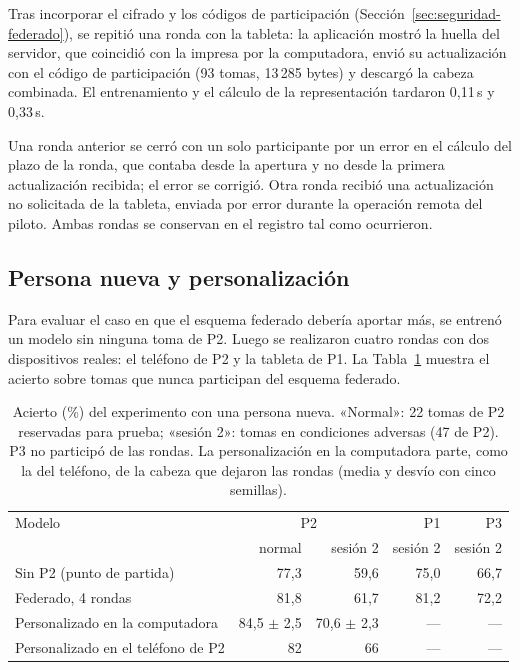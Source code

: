 Tras incorporar el cifrado y los códigos de participación (Sección~\ref{sec:seguridad-federado}), se repitió una ronda con la tableta: la aplicación mostró la huella del servidor, que coincidió con la impresa por la computadora, envió su actualización con el código de participación (93 tomas, 13\,285 bytes) y descargó la cabeza combinada. El entrenamiento y el cálculo de la representación tardaron 0,11\,s y 0,33\,s.

Una ronda anterior se cerró con un solo participante por un error en el cálculo del plazo de la ronda, que contaba desde la apertura y no desde la primera actualización recibida; el error se corrigió. Otra ronda recibió una actualización no solicitada de la tableta, enviada por error durante la operación remota del piloto. Ambas rondas se conservan en el registro tal como ocurrieron.

\subsection{Persona nueva y personalización}

Para evaluar el caso en que el esquema federado debería aportar más, se entrenó un modelo sin ninguna toma de P2. Luego se realizaron cuatro rondas con dos dispositivos reales: el teléfono de P2 y la tableta de P1. La Tabla~\ref{tab:federado-sin-p2} muestra el acierto sobre tomas que nunca participan del esquema federado.

\begin{table}[h]
    \centering
    \small
    \begin{tabular}{lrrrr}
        \toprule
        Modelo & \multicolumn{2}{c}{P2} & P1 & P3 \\
        & normal & sesión 2 & sesión 2 & sesión 2 \\
        \midrule
        Sin P2 (punto de partida) & 77,3 & 59,6 & 75,0 & 66,7 \\
        Federado, 4 rondas & 81,8 & 61,7 & 81,2 & 72,2 \\
        Personalizado en la computadora & 84,5 $\pm$ 2,5 & 70,6 $\pm$ 2,3 & --- & --- \\
        Personalizado en el teléfono de P2 & 82 & 66 & --- & --- \\
        \bottomrule
    \end{tabular}
    \caption{Acierto (\%) del experimento con una persona nueva. «Normal»: 22 tomas de P2 reservadas para prueba; «sesión 2»: tomas en condiciones adversas (47 de P2). P3 no participó de las rondas. La personalización en la computadora parte, como la del teléfono, de la cabeza que dejaron las rondas (media y desvío con cinco semillas).}
    \label{tab:federado-sin-p2}
\end{table}

